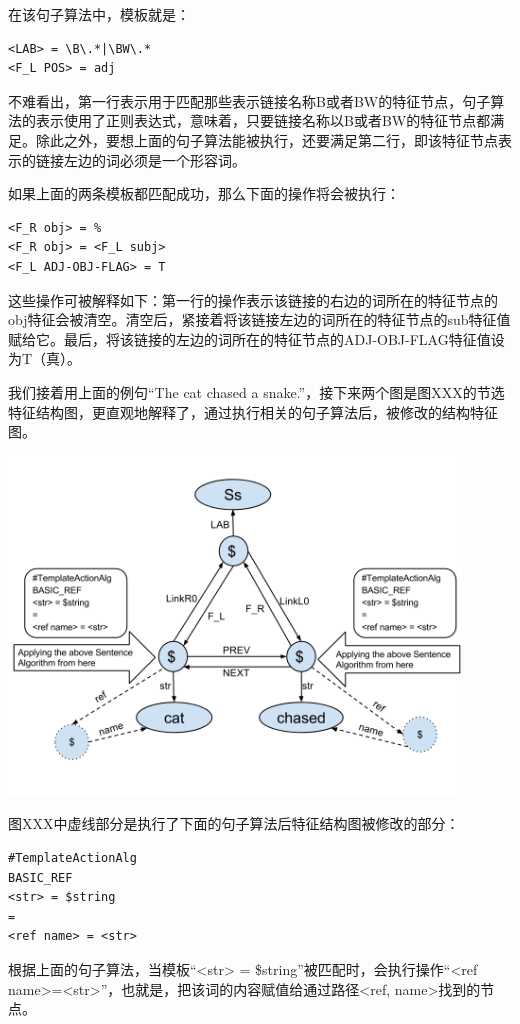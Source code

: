 在该句子算法中，模板就是：

\begin{verbatim}
<LAB> = \B\.*|\BW\.*
<F_L POS> = adj
\end{verbatim}

不难看出，第一行表示用于匹配那些表示链接名称B或者BW的特征节点，句子算法的表示使用了正则表达式，意味着，只要链接名称以B或者BW的特征节点都满足。除此之外，要想上面的句子算法能被执行，还要满足第二行，即该特征节点表示的链接左边的词必须是一个形容词。

如果上面的两条模板都匹配成功，那么下面的操作将会被执行：

\begin{verbatim}
<F_R obj> = %
<F_R obj> = <F_L subj>
<F_L ADJ-OBJ-FLAG> = T
\end{verbatim}

这些操作可被解释如下：第一行的操作表示该链接的右边的词所在的特征节点的obj特征会被清空。清空后，紧接着将该链接左边的词所在的特征节点的sub特征值赋给它。最后，将该链接的左边的词所在的特征节点的ADJ-OBJ-FLAG特征值设为T（真）。

我们接着用上面的例句“The cat chased a snake.”，接下来两个图是图XXX的节选特征结构图，更直观地解释了，通过执行相关的句子算法后，被修改的结构特征图。  

\includegraphics[width=12cm]{figures/revisedFeatureStructure.png}

图XXX中虚线部分是执行了下面的句子算法后特征结构图被修改的部分：

\begin{verbatim}
#TemplateActionAlg
BASIC_REF
<str> = $string
=
<ref name> = <str>
\end{verbatim}

根据上面的句子算法，当模板“<str> = \$string”被匹配时，会执行操作“<ref name>=<str>”，也就是，把该词的内容赋值给通过路径<ref, name>找到的节点。


